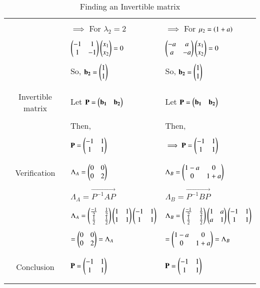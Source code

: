 \documentclass[journal,12pt]{IEEEtran}
\begin{document}
\begin{longtable}{|c|l|l|}
     &&\\
     & $\implies$ For $\lambda_2 = 2$
     & $\implies$ For $\mu_2 = \left(1+a\right)$\\
     &&\\
     & $\begin{pmatrix}-1&1\\1&-1\end{pmatrix}\begin{pmatrix}x_1\\x_2\end{pmatrix}= 0$
     & $\begin{pmatrix}-a&a\\a&-a\end{pmatrix}\begin{pmatrix}x_1\\x_2\end{pmatrix}= 0$\\
     &&\\
     & So, $\mathbf{b_2} = \begin{pmatrix}1\\1\end{pmatrix}$
     & So, $\mathbf{b_2} = \begin{pmatrix}1\\1\end{pmatrix}$\\
     &&\\
\hline
     &&\\
     Invertible matrix 
     & Let $\mathbf{P} = \begin{pmatrix}\mathbf{b_1} &\mathbf{b_2}\end{pmatrix}$
     & Let $\mathbf{P} = \begin{pmatrix}\mathbf{b_1} &\mathbf{b_2}\end{pmatrix}$\\
     &&\\
     & Then,
     & Then,\\
     &&\\
     & $\mathbf{P}=\begin{pmatrix}-1&1\\1&1\end{pmatrix}$
     & $ \implies \mathbf{P}=\begin{pmatrix}-1&1\\1&1\end{pmatrix}$\\
     &&\\
\hline
     &&\\
     Verification
     & $\Lambda_A=\begin{pmatrix}0&0\\0&2\end{pmatrix}$ &
     $\Lambda_B=\begin{pmatrix}1-a&0\\0&1+a\end{pmatrix}$\\
     &&\\
     & $\Lambda_{A}=\vec{P^{-1}AP}$&$\Lambda_{B}=\vec{P^{-1}BP}$\\
     &&\\
     & $\Lambda_A=\begin{pmatrix}\frac{-1}{2}&\frac{1}{2}\\ \frac 
     {1}{2}&\frac{1}{2}\end{pmatrix} \begin{pmatrix}1&1\\1&1\end{pmatrix} \begin{pmatrix}-1&1\\1&1\end{pmatrix}$
     & $\Lambda_B=\begin{pmatrix}\frac{-1}{2}&\frac{1}{2}\\ \frac
     {1}{2}&\frac{1}{2}\end{pmatrix} \begin{pmatrix}1&a\\a&1\end{pmatrix} \begin{pmatrix}-1&1\\1&1\end{pmatrix}$\\
     &&\\
     & $=\begin{pmatrix}0&0\\0&2\end{pmatrix}=\Lambda_A$ 
     & $=\begin{pmatrix}1-a&0\\0&1+a\end{pmatrix}=\Lambda_B$\\
     &&\\
     \hline
     &&\\
     Conclusion
     &  $\mathbf{P}=\begin{pmatrix}-1&1\\1&1\end{pmatrix}$
     &  $\mathbf{P}=\begin{pmatrix}-1&1\\1&1\end{pmatrix}$\\
     &&\\
\hline
\caption{Finding an Invertible matrix}
\label{table:2}
\end{longtable}
\end{document}
